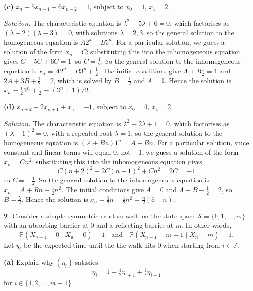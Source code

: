 \documentclass[
  a4paper,
]{article}
\theoremstyle{definition}
\theoremstyle{definition}
\theoremstyle{definition}
\theoremstyle{remark}
\begin{document}
\textbf{(c)} \(x_n-5x_{n-1} + 6x_{n-2} = 1\), subject to \(x_0 = 1\), \(x_1 = 2\).

\begin{myanswers}
\emph{Solution.} The characteristic equation is \(\lambda^2 - 5\lambda + 6 = 0\), which factorises as \((\lambda - 2)(\lambda - 3) = 0\), with solutions \(\lambda = 2,3\), so the general solution to the homogeneous equation is \(A2^n + B3^n\). For a particular solution, we guess a solution of the form \(x_n = C\); substituting this into the inhomogeneous equation gives \(C - 5C + 6C = 1\), so \(C = \frac12\). So the general solution to the inhomogeneous equation is \(x_n = A2^n + B3^n + \frac12\). The initial conditions give \(A+B \frac12= 1\) and \(2A + 3B + \frac12= 2\), which is solved by \(B = \frac12\) and \(A = 0\). Hence the solution is \(x_n = \frac12 3^n + \frac12 = (3^n + 1)/2\).

\end{myanswers}

\textbf{(d)} \(x_{n+2} - 2x_{n+1} + x_n = -1\), subject to \(x_0 = 0\), \(x_1 = 2\).

\begin{myanswers}
\emph{Solution.} The characteristic equation is \(\lambda^2 - 2\lambda + 1 = 0\), which factorises as \((\lambda - 1)^2 = 0\), with a repeated root \(\lambda = 1\), so the general solution to the homogeneous equation is \((A + Bn)1^n = A + Bn\). For a particular solution, since constant and linear terms will equal \(0\), not \(-1\), we guess a solution of the form \(x_n = Cn^2\); substituting this into the inhomogeneous equation gives
\[ C(n+2)^2 - 2C(n+1)^2 + Cn^2 = 2C = -1  \]
so \(C = -\frac12\). So the general solution to the inhomogeneous equation is \(x_n = A + Bn - \frac12 n^2\). The initial conditions give \(A = 0\) and \(A + B - \frac12= 2\), so \(B = \frac52\). Hence the solution is \(x_n = \frac52n - \frac12n^2 = \frac n2(5-n)\).

\end{myanswers}

\textbf{2.} Consider a simple symmetric random walk on the state space \(\mathcal{S} = \{0,1,\ldots ,m\}\) with an absorbing barrier at \(0\) and a reflecting barrier at \(m\). In other words,
\[ \mathbb P(X_{n+1} = 0 \mid X_n = 0) = 1 \quad \text{and} \quad  \mathbb P(X_{n+1} = m-1 \mid X_n = m) = 1 . \]
Let \(\eta_i\) be the expected time until the the walk hits \(0\) when starting from \(i \in \mathcal S\).

\textbf{(a)} Explain why \((\eta_i)\) satisfies
\[ \eta_i = 1 + \tfrac12 \eta_{i+1} +\tfrac12 \eta_{i-1} \]
for \(i \in \{1,2,\dots,m-1\}\).
\end{document}
